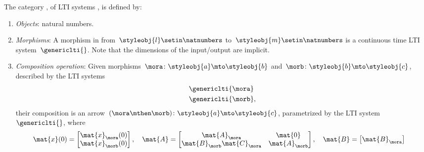 \begin{ctdefinition}
    \label{def:LTICat}
    The category \LTI, of LTI systems \iindex{\LTI}, is defined by:
    \begin{enumerate}
        \item \emph{Objects}: natural numbers.
        \item \emph{Morphisms}: A morphism in \LTI from~$\styleobj{l}\setin \natnumbers$ to~$\styleobj{m}\setin \natnumbers$ is a continuous time LTI system~$\genericlti{}$.
              Note that the dimensions of the input/output are implicit.
        \item \emph{Composition operation}: Given morphisms~$\mora \colon \styleobj{a}\mto \styleobj{b}$ and~$\morb\colon \styleobj{b}\mto \styleobj{c}$, described by the LTI systems
              \begin{equation*}
                  \begin{aligned}
                       & \genericlti{\mora} \\
                       & \genericlti{\morb},
                  \end{aligned}
              \end{equation*}
              their composition is an arrow~$(\mora \mthen \morb)\colon \styleobj{a}\mto \styleobj{c}$, parametrized by the LTI system~$\genericlti{}$, where
              \begin{equation}
                  \begin{aligned}
                      \mat{x}(0) & =\begin{bmatrix}
                                        \mat{x}_\mora(0) \\
                                        \mat{x}_\morb(0) \\
                                    \end{bmatrix},\quad
                      \mat{A}=\begin{bmatrix}
                                  \mat{A}_\mora              & \mat{0}       \\
                                  \mat{B}_\morb\mat{C}_\mora & \mat{A}_\morb
                              \end{bmatrix},\quad
                      \mat{B}=\begin{bmatrix}
                                  \mat{B}_\mora \\

\end{bmatrix}
\end{aligned}
\end{equation}
\end{enumerate}
\end{ctdefinition}
